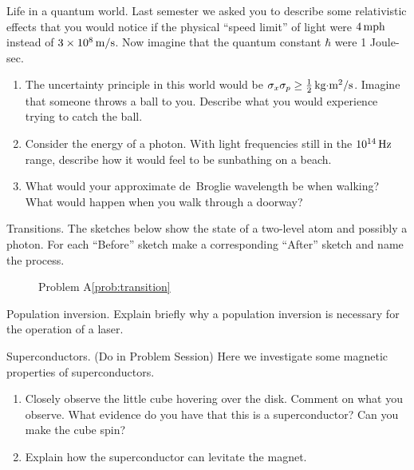 \begin{aproblem}{Life in a quantum world.} 
  Last semester we asked you to describe some relativistic effects
  that you would notice if the physical ``speed limit'' of light were
  $4\,\mbox{mph}$ instead of $3 \times 10^8\,\mbox{m/s}$. Now imagine
  that the quantum constant $\hbar$ were 1 Joule-sec.
  \begin{enumerate}
  \item The uncertainty principle in this world would be $\sigma_x
    \sigma_p \geq \frac{1}{2}\,\mbox{kg$\cdot$m$^2$/s}$.  Imagine that
    someone throws a ball to you. Describe what you would experience
    trying to catch the ball.
  \item Consider the energy of a photon.  With light frequencies still
    in the $10^{14}\,\mbox{Hz}$ range, describe how it would feel to be
    sunbathing on a beach.
  \item What would your approximate de~Broglie wavelength be when
    walking? What would happen when you walk through a doorway?
  \end{enumerate}
\end{aproblem}

\newpage

\begin{aproblem}{Transitions.}  
  The sketches below show the state of a two-level atom and possibly a
  photon.  For each ``Before'' sketch make a corresponding ``After''
  sketch and name the process.
  \label{prob:transition}

  \begin{figure}[h]
    \begin{center}
      \caption{Problem A\ref{prob:transition}}
    \end{center}
  \end{figure}
\end{aproblem}


\begin{aproblem}{Population inversion.} 
  Explain briefly why a population inversion is necessary for the
  operation of a laser.
\end{aproblem}


\begin{aproblem}{Superconductors.} 
  (Do in Problem Session) Here we investigate some magnetic properties
  of superconductors.
  \begin{enumerate} 
  \item Closely observe the little cube hovering over the
    disk. Comment on what you observe.  What evidence do you have that
    this is a superconductor?  Can you make the cube spin?
  \item Explain how the superconductor can levitate the magnet.
  \end{enumerate}
\end{aproblem}


